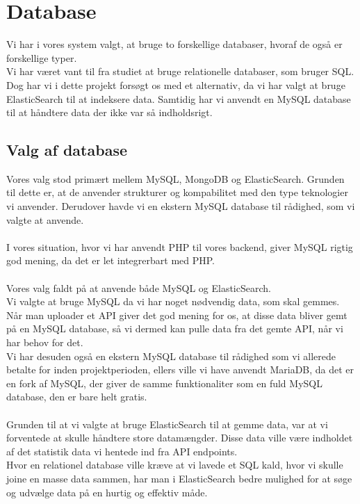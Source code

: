 \section{Database}
Vi har i vores system valgt, at bruge to forskellige databaser, hvoraf de også er forskellige typer.
\\
Vi har været vant til fra studiet at bruge relationelle databaser, som bruger SQL. Dog har vi i dette projekt 
forsøgt os med et alternativ, da vi har valgt at bruge ElasticSearch til at indeksere data.
Samtidig har vi anvendt en MySQL database til at håndtere data der ikke var så indholdsrigt.
\subsection{Valg af database}
Vores valg stod primært mellem MySQL, MongoDB og ElasticSearch. Grunden til dette er, at de anvender strukturer og
kompabilitet med den type teknologier vi anvender. Derudover havde vi en ekstern MySQL database til rådighed, som vi valgte at anvende.
\\\\
I vores situation, hvor vi har anvendt PHP til vores backend, giver MySQL rigtig god mening, da det er let integrerbart med PHP.
\\\\
Vores valg faldt på at anvende både MySQL og ElasticSearch.
\\
Vi valgte at bruge MySQL da vi har noget nødvendig data, som skal gemmes. Når man uploader et API giver det god mening
for os, at disse data bliver gemt på en MySQL database, så vi dermed kan pulle data fra det gemte API, når vi har behov for det.\\
Vi har desuden også en ekstern MySQL database til rådighed som vi allerede betalte for inden projektperioden, ellers ville vi have anvendt MariaDB, da det er en fork af MySQL, 
der giver de samme funktionaliter som en fuld MySQL database, den er bare helt gratis.
\\\\
Grunden til at vi valgte at bruge ElasticSearch til at gemme data, var at vi forventede at skulle håndtere store datamængder.
Disse data ville være indholdet af det statistik data vi hentede ind fra API endpoints.
\\
Hvor en relationel database ville kræve at vi lavede et SQL kald, hvor vi skulle joine en masse data sammen, har man i ElasticSearch
bedre mulighed for at søge og udvælge data på en hurtig og effektiv måde.
\\
